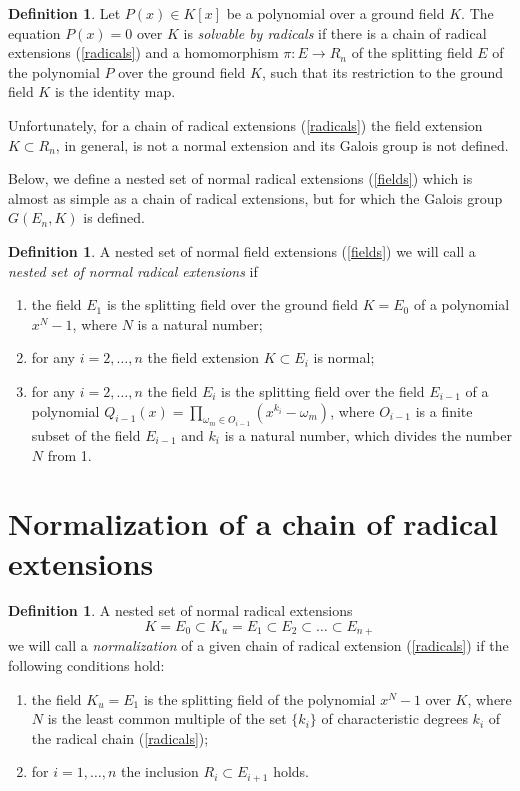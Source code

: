 \documentclass[11pt]{article}
\theoremstyle{plain}
\theoremstyle{definition}
\newtheorem{definition}[theorem]{Definition}
\begin{document}
\begin{definition} Let $P(x)\in K[x]$ be a polynomial over a ground  field $K$. The equation $P(x)=0$ over $K$ is {\it solvable by radicals} if there is a chain of radical extensions (\ref{radicals}) and a homomorphism  $\pi:E\to R_n$ of the splitting field $E$ of the polynomial $P$ over the ground field $K$, such that its restriction  to the ground  field $K$ is the identity map.
\end{definition}

Unfortunately, for a chain of  radical extensions (\ref{radicals}) the field extension $K\subset R_n$, in general, is not a normal extension and its Galois group is not defined.

Below, we  define a nested set of normal radical extensions (\ref{fields}) which is almost as simple as a chain of radical extensions, but for which the Galois group $G(E_n,K)$ is defined.

\begin{definition}  A nested set of normal field extensions (\ref{fields}) we will call  a   {\it nested set  of normal  radical extensions} if

\begin{enumerate}
\item the field $E_1$ is the splitting field over the  ground field $K=E_0$ of a polynomial $x^N-1$,  where $N$ is a natural number;
 \item for any $i=2,\dots,n$ the field extension $K\subset E_i$ is normal;
 \item  for any $i=2,\dots,n$  the field  $E_i$ is the splitting field over the field $E_{i-1}$ of a polynomial $Q_{i-1}(x)=\prod_{\omega _m\in O_{i-1}} (x^{k_i}-\omega_m)$,  where $O_{i-1}$ is a finite subset of the field  $E_{i-1}$ and $k_i$ is a natural number, which divides the number $N$ from 1.
\end{enumerate}
\end{definition}

\section{Normalization of a chain of radical extensions}

\begin{definition} A nested set of normal radical extensions
\begin{equation}\label{nestedrad}
 K=E_0\subset K_u=E_1\subset E_2\subset \dots\subset E_{n+}
 \end{equation}
we will call a {\it normalization} of  a given chain of radical extension (\ref{radicals}) if the following conditions hold:
 \begin{enumerate}
\item the field $K_u=E_1$ is the splitting field of the polynomial $x^N-1$ over $K$, where $N$ is the least common multiple of the set $\{k_i\}$  of characteristic degrees $k_i$ of the radical chain (\ref{radicals});
\item for $i=1,\ldots, n$ the inclusion $R_i\subset E_{i+1}$ holds.
\end{enumerate}
\end{definition}
\end{document}
